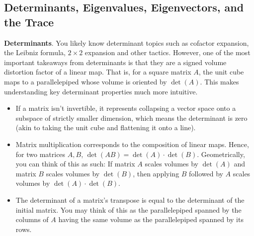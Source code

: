 \documentclass{article}
\begin{document}
\subsection{Determinants, Eigenvalues, Eigenvectors, and the Trace}
 
\textbf{Determinants}. You likely know determinant topics such as cofactor expansion, the Leibniz formula, $2 \times 2$ expansion and other tactics. However, one of the most important takeaways from determinants is that they are a signed volume distortion factor of a linear map. That is, for a square matrix $A$, the unit cube maps to a parallelepiped whose volume is oriented by $\det (A)$. This makes understanding key determinant properties much more intuitive.
\begin{itemize}
    \item If a matrix isn't invertible, it represents collapsing a vector space onto a subspace of strictly smaller dimension, which means the determinant is zero (akin to taking the unit cube and flattening it onto a line).
    \item Matrix multiplication corresponds to the composition of linear maps. Hence, for two matrices $A, B$, $\det(AB)=\det(A)\cdot \det(B)$. Geometrically, you can think of this as such: If matrix $A$ scales volumes by $\det(A)$ and matrix $B$ scales volumes by $\det(B)$, then applying $B$ followed by $A$ scales volumes by $\det(A)\cdot\det(B)$.
    \item The determinant of a matrix's transpose is equal to the determinant of the initial matrix. You may think of this as the parallelepiped spanned by the columns of $A$ having the same volume as the parallelepiped spanned by its rows.
\end{itemize}
 
\end{document}
